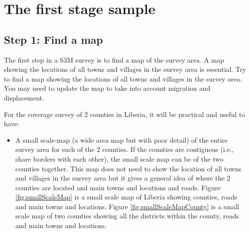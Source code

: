 \documentclass[12pt,a4paper]{book}
\providecommand{\tightlist}{%
  \setlength{\itemsep}{0pt}\setlength{\parskip}{0pt}}
\theoremstyle{definition}
\theoremstyle{definition}
\theoremstyle{definition}
\theoremstyle{remark}
\begin{document}
\hypertarget{stage1}{%
\section{The first stage sample}\label{stage1}}

\hypertarget{step-1-find-a-map}{%
\subsection{Step 1: Find a map}\label{step-1-find-a-map}}

The first step in a S3M survey is to find a map of the survey area. A
map showing the locations of all towns and villages in the survey area
is essential. Try to find a map showing the locations of all towns and
villages in the survey area. You may need to update the map to take into
account migration and displacement.

For the coverage survey of 2 counties in Liberia, it will be practical
and useful to have:

\begin{itemize}
\tightlist
\item
  A small scale-map (a wide area map but with poor detail) of the entire
  survey area for each of the 2 counties. If the counties are contiguous
  (i.e., share borders with each other), the small scale map can be of
  the two counties together. This map does not need to show the location
  of all towns and villages in the survey area but it gives a general
  idea of where the 2 counties are located and main towns and locations
  and roads. Figure \ref{fig:smallScaleMap} is a small scale map of
  Liberia showing counties, roads and main towns and locations. Figure
  \ref{fig:smallScaleMapCounty} is a small scale map of two counties
  showing all the districts within the county, roads and main towns and
  locations.
\end{itemize}

\newpage
\end{document}
